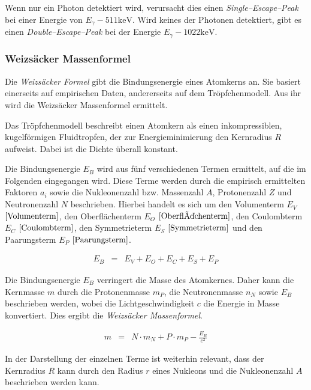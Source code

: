 \documentclass[12pt,a4paper]{scrartcl}
\numberwithin{equation}{section} %
\newcommand{\pu}[1]{\ensuremath{\mathrm{#1}}}
\begin{document}
Wenn nur ein Photon detektiert wird, verursacht dies einen \emph{Single--Escape--Peak} bei einer Energie von
$E_\gamma - \pu{511 keV}$. Wird keines der Photonen detektiert, gibt es einen \emph{Double--Escape--Peak} bei der Energie $E_\gamma - \pu{1022 keV}$.

\hypertarget{weizsuxe4cker-massenformel}{%
	\subsubsection{Weizsäcker Massenformel}\label{weizsuxe4cker-massenformel}}
Die \emph{Weizsäcker Formel} gibt die Bindungsenergie eines Atomkerns an. Sie basiert einerseits auf empirischen Daten, andererseits auf dem Tröpfchenmodell. Aus ihr wird die Weizsäcker Massenformel ermittelt.

Das Tröpfchenmodell beschreibt einen Atomkern als einen inkompressiblen, kugelförmigen Fluidtropfen, der zur Energieminimierung den Kernradius $R$ aufweist. Dabei ist die Dichte überall konstant.

Die Bindungsenergie $E_B$ wird aus fünf verschiedenen Termen ermittelt, auf die im Folgenden eingegangen wird. Diese Terme werden durch die empirisch ermittelten Faktoren $a_i$ sowie die Nukleonenzahl bzw. Massenzahl $A$, Protonenzahl $Z$ und Neutronenzahl $N$ beschrieben. Hierbei handelt es sich um den Volumenterm $E_V$ $\eqref{Volumenterm}$, den Oberflächenterm $E_O$ $\eqref{Oberflächenterm}$, den Coulombterm $E_C$ $\eqref{Coulombterm}$, den Symmetrieterm $E_S$ $\eqref{Symmetrieterm}$ und den Paarungsterm $E_P$ $\eqref{Paarungsterm}$.

\begin{eqnarray}
	E_B &=& E_V + E_O + E_C + E_S + E_P
\end{eqnarray}

\noindent
Die Bindungsenergie $E_B$ verringert die Masse des Atomkernes. Daher kann die Kernmasse $m$ durch die Protonenmasse $m_P$, die Neutronenmasse $n_N$ sowie $E_B$ beschrieben werden, wobei die Lichtgeschwindigkeit $c$ die Energie in Masse konvertiert. Dies ergibt die \emph{Weizsäcker Massenformel}.

\begin{eqnarray}
	m &=& N\cdot m_N + P\cdot m_P - \frac{E_B}{c^2}
\end{eqnarray}

\noindent
In der Darstellung der einzelnen Terme ist weiterhin relevant, dass der Kernradius $R$ kann durch den Radius $r$ eines Nukleons und die Nukleonenzahl $A$ beschrieben werden kann.
\end{document}
